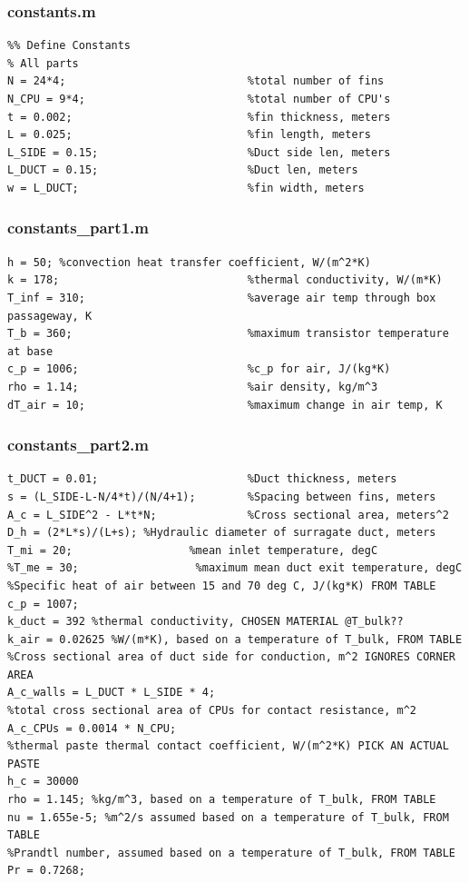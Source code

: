 \documentclass[12pt, titlepage]{article}
\begin{document}
\subsubsection{constants.m}
\begin{verbatim}
%% Define Constants
% All parts
N = 24*4;                            %total number of fins
N_CPU = 9*4;                         %total number of CPU's
t = 0.002;                           %fin thickness, meters
L = 0.025;                           %fin length, meters
L_SIDE = 0.15;                       %Duct side len, meters
L_DUCT = 0.15;                       %Duct len, meters
w = L_DUCT;                          %fin width, meters
\end{verbatim}
\subsubsection{constants\_part1.m}
\begin{verbatim}
h = 50; %convection heat transfer coefficient, W/(m^2*K)
k = 178;                             %thermal conductivity, W/(m*K)
T_inf = 310;                         %average air temp through box passageway, K
T_b = 360;                           %maximum transistor temperature at base
c_p = 1006;                          %c_p for air, J/(kg*K)
rho = 1.14;                          %air density, kg/m^3
dT_air = 10;                         %maximum change in air temp, K
\end{verbatim}
\noindent
\subsubsection{constants\_part2.m}
\begin{verbatim}
t_DUCT = 0.01;                       %Duct thickness, meters
s = (L_SIDE-L-N/4*t)/(N/4+1);        %Spacing between fins, meters
A_c = L_SIDE^2 - L*t*N;              %Cross sectional area, meters^2
D_h = (2*L*s)/(L+s); %Hydraulic diameter of surragate duct, meters
T_mi = 20;                  %mean inlet temperature, degC
%T_me = 30;                  %maximum mean duct exit temperature, degC
%Specific heat of air between 15 and 70 deg C, J/(kg*K) FROM TABLE
c_p = 1007;
k_duct = 392 %thermal conductivity, CHOSEN MATERIAL @T_bulk??
k_air = 0.02625 %W/(m*K), based on a temperature of T_bulk, FROM TABLE
%Cross sectional area of duct side for conduction, m^2 IGNORES CORNER AREA
A_c_walls = L_DUCT * L_SIDE * 4;
%total cross sectional area of CPUs for contact resistance, m^2
A_c_CPUs = 0.0014 * N_CPU;
%thermal paste thermal contact coefficient, W/(m^2*K) PICK AN ACTUAL PASTE
h_c = 30000
rho = 1.145; %kg/m^3, based on a temperature of T_bulk, FROM TABLE
nu = 1.655e-5; %m^2/s assumed based on a temperature of T_bulk, FROM TABLE
%Prandtl number, assumed based on a temperature of T_bulk, FROM TABLE
Pr = 0.7268;

\end{verbatim}
\noindent
\end{document}
